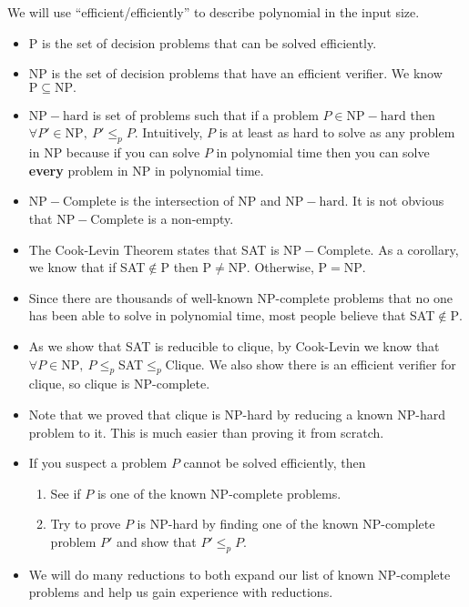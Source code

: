 \documentclass[a4paper,12pt]{article}
\begin{document}
\begin{definition}[P,NP,NP-Complete]
    We will use ``efficient/efficiently'' to describe polynomial in the input size.
    \begin{itemize}
        \item $\mathrm{P}$ is the set of decision problems that can be solved efficiently.
        \item $\mathrm{NP}$ is the set of decision problems that have an efficient verifier. We know $\mathrm{P}\subseteq\mathrm{NP}.$
        \item $\mathrm{NP-hard}$ is set of problems such that if a problem $P\in\mathrm{NP-hard}$ then $\forall P'\in\mathrm{NP},~P'\leq_pP.$ Intuitively, $P$ is at least as hard to solve as any problem in $\mathrm{NP}$ because if you can solve $P$ in polynomial time then you can solve \textbf{every} problem in NP in polynomial time.
        \item $\mathrm{NP-Complete}$ is the intersection of $\mathrm{NP}$ and $\mathrm{NP-hard}.$ It is not obvious that $\mathrm{NP-Complete}$ is a non-empty.
    \end{itemize}
\end{definition}
\begin{itemize}
    \item The Cook-Levin Theorem states that SAT is $\mathrm{NP-Complete}.$ As a corollary, we know that if SAT$\notin\mathrm{P}$ then $\mathrm P\neq\mathrm{NP}.$ Otherwise, $\mathrm{P}=\mathrm{NP}.$
    \item Since there are thousands of well-known NP-complete problems that no one has been able to solve in polynomial time, most people believe that SAT$\notin\mathrm{P}.$
    \item As we show that SAT is reducible to clique, by Cook-Levin we know that $\forall P\in\mathrm{NP},~P\leq_p$SAT$\leq_p$Clique. We also show there is an efficient verifier for clique, so clique is NP-complete.
    \item Note that we proved that clique is NP-hard by reducing a known NP-hard problem to it. This is much easier than proving it from scratch.
    \item If you suspect a problem $P$ cannot be solved efficiently, then \begin{enumerate}
        \item See if $P$ is one of the known NP-complete problems.
        \item Try to prove $P$ is NP-hard by finding one of the known NP-complete problem $P'$ and show that $P'\leq_pP.$ 
    \end{enumerate}
    \item We will do many reductions to both expand our list of known NP-complete problems and help us gain experience with reductions.
\end{itemize}
\end{document}
